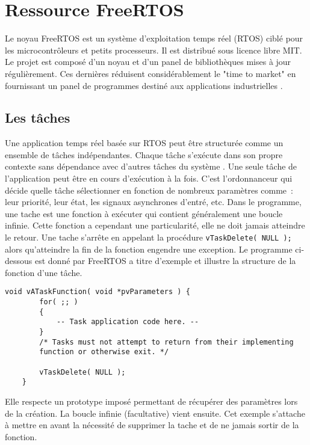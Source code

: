 \section{Ressource FreeRTOS}


Le noyau FreeRTOS est un système d'exploitation temps réel (RTOS) ciblé pour les microcontrôleurs et petits processeurs.
Il est distribué sous licence libre MIT.
Le projet est composé d'un noyau et d'un panel de bibliothèques mises à jour régulièrement.
Ces dernières réduisent considérablement le "time to market" en fournissant un panel de programmes destiné aux applications industrielles \cite{web_freeRTOS}.

\subsection{Les tâches}
Une application temps réel basée sur RTOS peut être structurée comme un ensemble de tâches indépendantes. 
Chaque tâche s'exécute dans son propre contexte sans dépendance avec d'autres tâches du système \cite{web_freeRTOS_task}.
Une seule tâche de l'application peut être en cours d'exécution à la fois.
C'est l'ordonnanceur qui décide quelle tâche sélectionner en fonction de nombreux paramètres comme : leur priorité, leur état, les signaux asynchrones d'entré, etc. 
Dans le programme, une tache est une fonction à exécuter qui contient généralement une boucle infinie.
Cette fonction a cependant une particularité, elle ne doit jamais atteindre le retour.
Une tache s'arrête en appelant la procédure \texttt{vTaskDelete( NULL );} alors qu'atteindre la fin de la fonction engendre une exception.
Le programme ci-dessous est donné par FreeRTOS \cite{web_freeRTOS_task} a titre d'exemple et illustre la structure de la fonction d'une tâche.
\begin{lstlisting}[style=CStyle]
    void vATaskFunction( void *pvParameters ) {
        for( ;; )
        {
            -- Task application code here. --
        }
        /* Tasks must not attempt to return from their implementing
        function or otherwise exit. */

        vTaskDelete( NULL );
    }
\end{lstlisting}
Elle respecte un prototype imposé permettant de récupérer des paramètres lors de la création.
La boucle infinie (facultative) vient ensuite.
Cet exemple s'attache à mettre en avant la nécessité de supprimer la tache et de ne jamais sortir de la fonction.

